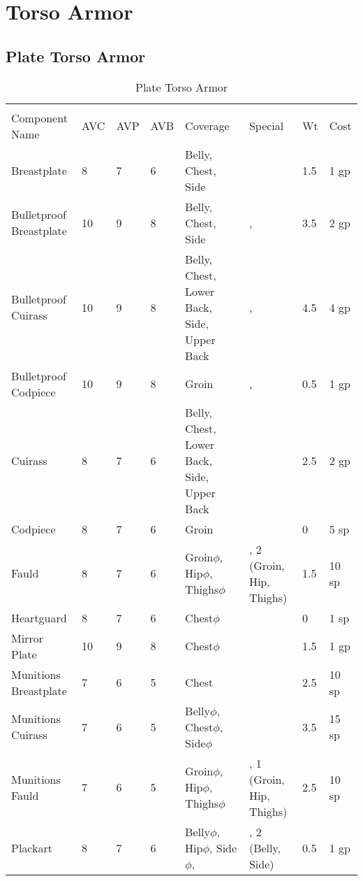 \documentclass[oneside,11pt,english]{book}
\begin{document}
\section{Torso Armor}
\subsection{Plate Torso Armor}
\begin{longtabu} to 
  \captionsetup{textformat=empty, labelformat=blank}
  \caption{Plate Torso Armor} \vspace{-15pt}
  \label{tab:Plate Torso Armor}\\
  Component Name&AVC&AVP&AVB& Coverage& Special& Wt&Cost\\\toprule
  Breastplate& 8& 7& 6& Belly, Chest, Side& & 1.5& 1 gp\\
  Bulletproof Breastplate& 10& 9& 8& Belly, Chest, Side& , & 3.5& 2 gp\\
  Bulletproof Cuirass& 10& 9& 8& Belly, Chest, Lower Back, Side, Upper Back& , & 4.5& 4 gp\\
  Bulletproof Codpiece& 10& 9& 8& Groin& , & 0.5& 1 gp\\
  Cuirass& 8& 7& 6& Belly, Chest, Lower Back, Side, Upper Back& & 2.5& 2 gp\\
  Codpiece& 8& 7& 6& Groin& & 0& 5 sp\\
  Fauld& 8& 7& 6& Groin\hyperref[sec:Weak Spots]{$\phi$}, Hip\hyperref[sec:Weak Spots]{$\phi$}, Thighs\hyperref[sec:Weak Spots]{$\phi$}& ,  2 (Groin, Hip, Thighs)& 1.5& 10 sp\\
  Heartguard& 8& 7& 6& Chest\hyperref[sec:Weak Spots]{$\phi$}& & 0& 1 sp\\
  Mirror Plate& 10& 9& 8& Chest\hyperref[sec:Weak Spots]{$\phi$}& & 1.5& 1 gp\\
  Munitions Breastplate& 7& 6& 5& Chest& & 2.5& 10 sp\\
  Munitions Cuirass& 7& 6& 5& Belly\hyperref[sec:Weak Spots]{$\phi$}, Chest\hyperref[sec:Weak Spots]{$\phi$}, Side\hyperref[sec:Weak Spots]{$\phi$}& & 3.5& 15 sp\\
  Munitions Fauld& 7& 6& 5& Groin\hyperref[sec:Weak Spots]{$\phi$}, Hip\hyperref[sec:Weak Spots]{$\phi$}, Thighs\hyperref[sec:Weak Spots]{$\phi$}& ,  1 (Groin, Hip, Thighs)& 2.5& 10 sp\\
  Plackart& 8& 7& 6& Belly\hyperref[sec:Weak Spots]{$\phi$}, Hip\hyperref[sec:Weak Spots]{$\phi$}, Side\hyperref[sec:Weak Spots]{$\phi$},& ,  2 (Belly, Side)& 0.5& 1 gp\\
\end{longtabu}
\end{document}

